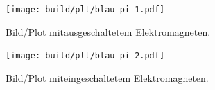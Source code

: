 \begin{figure}[H]
    \centering
    \texttt{[image: build/plt/blau\_pi\_1.pdf]}
    \caption{Bild/Plot mitausgeschaltetem Elektromagneten.}
    \label{fig:plt:blau_pi_1}
\end{figure}

\begin{figure}[H]
    \centering
    \texttt{[image: build/plt/blau\_pi\_2.pdf]}
    \caption{Bild/Plot miteingeschaltetem Elektromagneten.}
    \label{fig:plt:blau_pi_2}
\end{figure}
